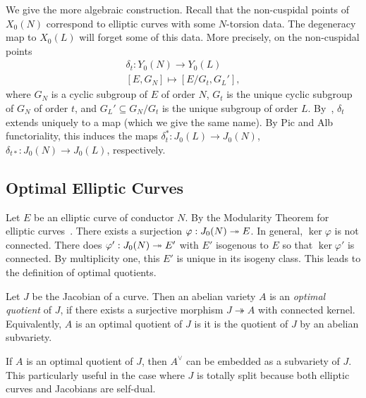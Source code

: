 We give the more algebraic construction. Recall that the non-cuspidal
points of $X_0(N)$ correspond to elliptic curves with some $N$-torsion data.
The degeneracy map to $X_0(L)$ will forget some of this data. More precisely,
on the non-cuspidal points
\begin{equation}
    \label{eq:degen_moduli}
    \begin{split}
        \delta_t: Y_0(N)  \to Y_0(L) \\
        [ E, G_N ]       \mapsto [ E/G_t, G_L ' ],
    \end{split}
\end{equation}
where $G_N$ is a cyclic subgroup of $E$ of order $N$, $G_t$ is the unique
cyclic subgroup of $G_N$ of order $t$, and $G_L '\subseteq G_N/G_t$ is the
unique subgroup of order $L$. By~\cite[Ghap. 1, Prop. 6.8]{hartshorne},
$\delta_t$ extends uniquely to a map (which we give the same name). By Pic
and Alb functoriality, this induces the maps $\delta_t ^*:J_0(L)\to
J_0(N)$, $\delta_{t*} :J_0(N)\to J_0(L)$, respectively.

\subsection{Optimal Elliptic Curves}%
\label{sub:optimal_elliptic_curves}

Let $E$ be an elliptic curve of conductor $N$. By the Modularity Theorem for
elliptic curves~\cite{breuil-conrad-diamond-taylor}. There exists a surjection
$\varphi:J_0(N)\twoheadrightarrow E$. In general, $\ker\varphi$ is not connected. There does
$\varphi':J_0(N)\twoheadrightarrow E'$ with $E'$ isogenous to $E$ so that $\ker\varphi'$ is
connected. By multiplicity one, this $E'$ is unique in its isogeny class. This
leads to the definition of optimal quotients.

\begin{definition}%
    \label{defn:optimal_quotient}
    Let $J$ be the Jacobian of a curve. Then an abelian variety $A$ is an
    \emph{optimal quotient} of $J$, if there exists a surjective morphism $J
    \twoheadrightarrow A$ with connected kernel. Equivalently, $A$ is an
    optimal quotient of $J$ is it is the quotient of $J$ by an abelian
    subvariety.
\end{definition}

If $A$ is an optimal quotient of $J$, then $A^\vee$ can be embedded as a
subvariety of $J$. This particularly useful in the case where $J$ is totally
split because both elliptic curves and Jacobians are self-dual.

